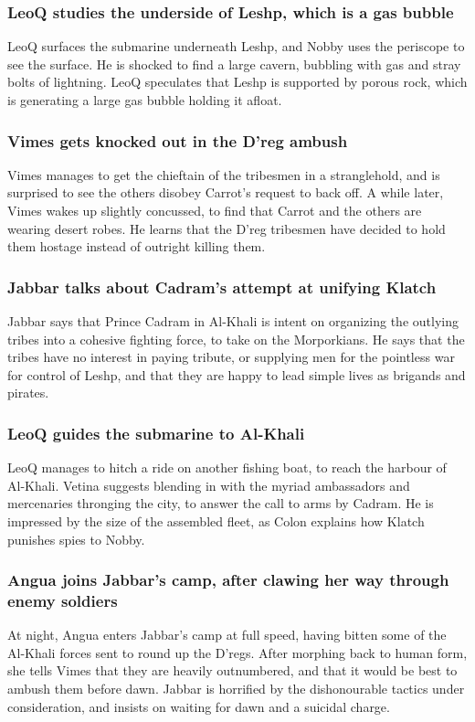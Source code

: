 \subsubsection{\Gls{LeoQ}  studies the underside of Leshp, which is a gas bubble}
\Gls{LeoQ} surfaces the submarine underneath Leshp, and \Gls{Nobby} uses the periscope to see the
surface. He is shocked to find a large cavern, bubbling with gas and stray bolts of lightning.
\Gls{LeoQ} speculates that Leshp is supported by porous rock, which is generating a large gas bubble
holding it afloat.

\subsubsection{\Gls{Vimes} gets knocked out in the D'reg ambush}
\Gls{Vimes} manages to get the chieftain of the tribesmen in a stranglehold, and is surprised to see
the others disobey \Gls{Carrot}'s request to back off. A while later, \Gls{Vimes} wakes up slightly
concussed, to find that \Gls{Carrot} and the others are wearing desert robes. He learns that the
D'reg tribesmen have decided to hold them hostage instead of outright killing them.

\subsubsection{\Gls{Jabbar} talks about \Gls{Cadram}'s attempt at unifying Klatch}
\Gls{Jabbar} says that Prince \Gls{Cadram} in Al-Khali is intent on organizing the outlying tribes
into a cohesive fighting force, to take on the Morporkians. He says that the tribes have no interest
in paying tribute, or supplying men for the pointless war for control of Leshp, and that they are
happy to lead simple lives as brigands and pirates.

\subsubsection{\Gls{LeoQ} guides the submarine to Al-Khali}
\Gls{LeoQ} manages to hitch a ride on another fishing boat, to reach the harbour of Al-Khali.
\Gls{Vetina} suggests blending in with the myriad ambassadors and mercenaries thronging the city,
to answer the call to arms by \Gls{Cadram}. He is impressed by the size of the assembled fleet, as
\Gls{Colon} explains how Klatch punishes spies to \Gls{Nobby}.

\subsubsection{\Gls{Angua} joins \Gls{Jabbar}'s camp, after clawing her way through enemy soldiers}
At night, \Gls{Angua} enters \Gls{Jabbar}'s camp at full speed, having bitten some of the Al-Khali
forces sent to round up the D'regs. After morphing back to human form, she tells \Gls{Vimes} that
they are heavily outnumbered, and that it would be best to ambush them before dawn. \Gls{Jabbar}
is horrified by the dishonourable tactics under consideration, and insists on waiting for dawn and
a suicidal charge.


